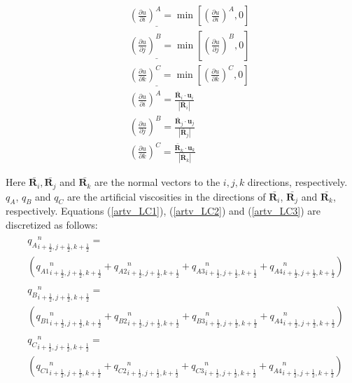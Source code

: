 \begin{enumerate}
	\begin{eqnarray*}
		&&\left(\frac{\partial u}{\partial i}\right)^A_{\_}=\min{\left[\left(\frac{\partial u}{\partial i}\right)^A,0\right]}\nonumber\\
		&&\left(\frac{\partial u}{\partial j}\right)^B_{\_}=\min{\left[\left(\frac{\partial u}{\partial j}\right)^B,0\right]}\nonumber\\
		&&\left(\frac{\partial u}{\partial k}\right)^C_{\_}=\min{\left[\left(\frac{\partial u}{\partial k}\right)^C,0\right]}\nonumber\\
		&&\left(\frac{\partial u}{\partial i}\right)^A=\frac{\bar{\bm R}_i\cdot{\bm u}_i}{\left|\bar{\bm R}_i\right|}\nonumber\\
		&&\left(\frac{\partial u}{\partial j}\right)^B=\frac{\bar{\bm R}_j\cdot{\bm u}_j}{\left|\bar{\bm R}_j\right|}\nonumber\\
		&&\left(\frac{\partial u}{\partial k}\right)^C=\frac{\bar{\bm R}_k\cdot{\bm u}_k}{\left|\bar{\bm R}_k\right|}\nonumber
	\end{eqnarray*}

Here $\bar{\bm R_i}, \bar{\bm R_j}$ and $\bar{\bm R_k}$ are the normal vectors to the $i, j, k$ directions, respectively. $q_A$, $q_B$ and $q_C$ are the artificial viscosities in the directions of $\bar{\bm R_i}$, $\bar{\bm R_j}$ and $\bar{\bm R_k}$, respectively. Equations (\ref{artv_LC1}), (\ref{artv_LC2}) and (\ref{artv_LC3}) are discretized as follows: 
	\begin{eqnarray}
\begin{split}
		&{q_A}^{n}_{i+\frac{1}{2},j+\frac{1}{2},k+\frac{1}{2}}=\\
&\left({q_{A1}}^{n}_{i+\frac{1}{2},j+\frac{1}{2},k+\frac{1}{2}}+{q_{A2}}^{n}_{i+\frac{1}{2},j+\frac{1}{2},k+\frac{1}{2}}+{q_{A3}}^{n}_{i+\frac{1}{2},j+\frac{1}{2},k+\frac{1}{2}}+{q_{A4}}^{n}_{i+\frac{1}{2},j+\frac{1}{2},k+\frac{1}{2}}\right)
\end{split}\\
\begin{split}
		&{q_B}^{n}_{i+\frac{1}{2},j+\frac{1}{2},k+\frac{1}{2}}=\\
&\left({q_{B1}}^{n}_{i+\frac{1}{2},j+\frac{1}{2},k+\frac{1}{2}}+{q_{B2}}^{n}_{i+\frac{1}{2},j+\frac{1}{2},k+\frac{1}{2}}+{q_{B3}}^{n}_{i+\frac{1}{2},j+\frac{1}{2},k+\frac{1}{2}}+{q_{A4}}^{n}_{i+\frac{1}{2},j+\frac{1}{2},k+\frac{1}{2}}\right)
\end{split}\\
\begin{split}
		&{q_C}^{n}_{i+\frac{1}{2},j+\frac{1}{2},k+\frac{1}{2}}=\\
&\left({q_{C1}}^{n}_{i+\frac{1}{2},j+\frac{1}{2},k+\frac{1}{2}}+{q_{C2}}^{n}_{i+\frac{1}{2},j+\frac{1}{2},k+\frac{1}{2}}+{q_{C3}}^{n}_{i+\frac{1}{2},j+\frac{1}{2},k+\frac{1}{2}}+{q_{A4}}^{n}_{i+\frac{1}{2},j+\frac{1}{2},k+\frac{1}{2}}\right)
\end{split}
	\end{eqnarray}
	

\end{enumerate}
